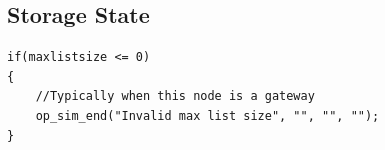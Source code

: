 \subsection{Storage State}
{\tiny
\begin{verbatim}
if(maxlistsize <= 0)
{
	//Typically when this node is a gateway
	op_sim_end("Invalid max list size", "", "", "");
}
\end{verbatim}
}
